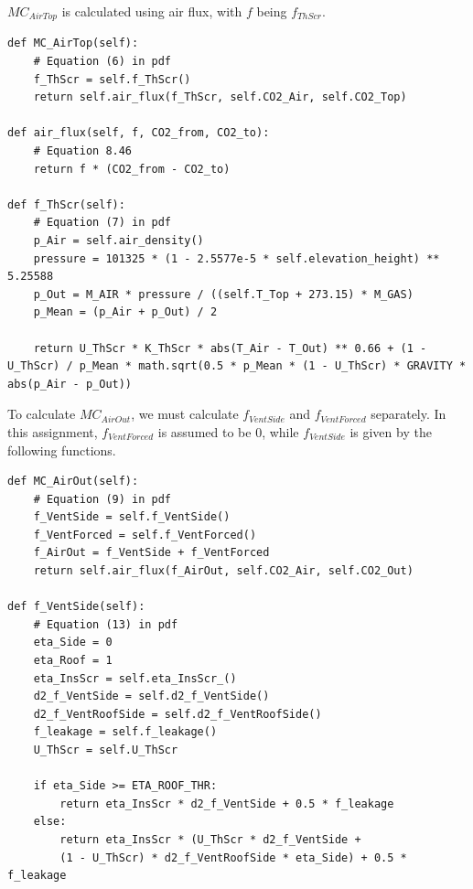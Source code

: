 \documentclass[a4paper]{article}
\numberwithin{equation}{section}
\begin{document}
\(MC_{AirTop}\) is calculated using air flux, with \(f\) being \(f_{ThScr}\).
\begin{mdframed}[leftline=false,rightline=false,backgroundcolor=magenta!10,nobreak=true]
  \begin{verbatim}
def MC_AirTop(self):
    # Equation (6) in pdf
    f_ThScr = self.f_ThScr()
    return self.air_flux(f_ThScr, self.CO2_Air, self.CO2_Top)
    
def air_flux(self, f, CO2_from, CO2_to):
    # Equation 8.46
    return f * (CO2_from - CO2_to)
    
def f_ThScr(self):
    # Equation (7) in pdf
    p_Air = self.air_density()
    pressure = 101325 * (1 - 2.5577e-5 * self.elevation_height) ** 5.25588
    p_Out = M_AIR * pressure / ((self.T_Top + 273.15) * M_GAS)
    p_Mean = (p_Air + p_Out) / 2

    return U_ThScr * K_ThScr * abs(T_Air - T_Out) ** 0.66 + (1 - U_ThScr) / p_Mean * math.sqrt(0.5 * p_Mean * (1 - U_ThScr) * GRAVITY * abs(p_Air - p_Out))
  \end{verbatim}
\end{mdframed}

To calculate \(MC_{AirOut}\), we must calculate \(f_{VentSide}\) and \(f_{VentForced}\) separately.
In this assignment, \(f_{VentForced}\) is assumed to be 0, while \(f_{VentSide}\) is given by the following functions.

\begin{mdframed}[leftline=false,rightline=false,backgroundcolor=magenta!10,nobreak=true]
  \begin{verbatim}
def MC_AirOut(self):
    # Equation (9) in pdf
    f_VentSide = self.f_VentSide()
    f_VentForced = self.f_VentForced()
    f_AirOut = f_VentSide + f_VentForced
    return self.air_flux(f_AirOut, self.CO2_Air, self.CO2_Out)
    
def f_VentSide(self):
    # Equation (13) in pdf
    eta_Side = 0
    eta_Roof = 1
    eta_InsScr = self.eta_InsScr_()
    d2_f_VentSide = self.d2_f_VentSide()
    d2_f_VentRoofSide = self.d2_f_VentRoofSide()
    f_leakage = self.f_leakage()
    U_ThScr = self.U_ThScr

    if eta_Side >= ETA_ROOF_THR:
        return eta_InsScr * d2_f_VentSide + 0.5 * f_leakage
    else:
        return eta_InsScr * (U_ThScr * d2_f_VentSide + 
        (1 - U_ThScr) * d2_f_VentRoofSide * eta_Side) + 0.5 * f_leakage
  \end{verbatim}
\end{mdframed}
\end{document}
